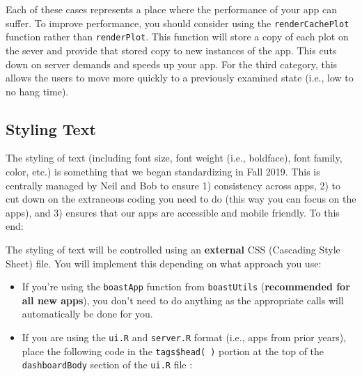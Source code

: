 \documentclass[
]{book}
\newenvironment{Shaded}{\begin{snugshade}}{\end{snugshade}}
\newcommand{\CommentTok}[1]{\textcolor[rgb]{0.56,0.35,0.01}{\textit{#1}}}
\newcommand{\DataTypeTok}[1]{\textcolor[rgb]{0.13,0.29,0.53}{#1}}
\newcommand{\DecValTok}[1]{\textcolor[rgb]{0.00,0.00,0.81}{#1}}
\newcommand{\KeywordTok}[1]{\textcolor[rgb]{0.13,0.29,0.53}{\textbf{#1}}}
\newcommand{\NormalTok}[1]{#1}
\newcommand{\OperatorTok}[1]{\textcolor[rgb]{0.81,0.36,0.00}{\textbf{#1}}}
\newcommand{\StringTok}[1]{\textcolor[rgb]{0.31,0.60,0.02}{#1}}
\providecommand{\tightlist}{%
  \setlength{\itemsep}{0pt}\setlength{\parskip}{0pt}}
\begin{document}
Each of these cases represents a place where the performance of your app can suffer. To improve performance, you should consider using the \texttt{renderCachePlot} function rather than \texttt{renderPlot}. This function will store a copy of each plot on the sever and provide that stored copy to new instances of the app. This cuts down on server demands and speeds up your app. For the third category, this allows the users to move more quickly to a previously examined state (i.e., low to no hang time).

\hypertarget{textStyle}{%
\subsection{Styling Text}\label{textStyle}}

The styling of text (including font size, font weight (i.e., boldface), font family, color, etc.) is something that we began standardizing in Fall 2019. This is centrally managed by Neil and Bob to ensure 1) consistency across apps, 2) to cut down on the extraneous coding you need to do (this way you can focus on the apps), and 3) ensures that our apps are accessible and mobile friendly. To this end:

The styling of text will be controlled using an \textbf{external} CSS (Cascading Style Sheet) file. You will implement this depending on what approach you use:

\begin{itemize}
\tightlist
\item
  If you're using the \texttt{boastApp} function from \texttt{boastUtils} (\textbf{recommended for all new apps}), you don't need to do anything as the appropriate calls will automatically be done for you.
\item
  If you are using the \texttt{ui.R} and \texttt{server.R} format (i.e., apps from prior years), place the following code in the \texttt{tags\$head(\ )} portion at the top of the \texttt{dashboardBody} section of the \texttt{ui.R} file :
\end{itemize}

\begin{Shaded}
\end{Shaded}
\end{document}
